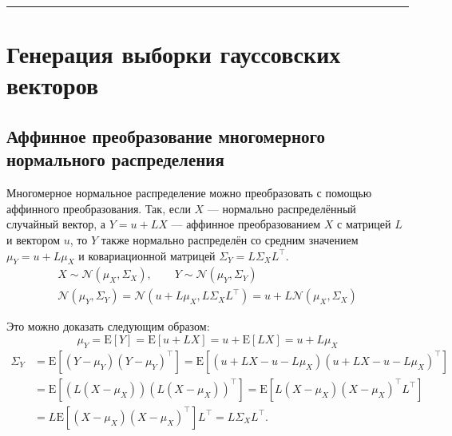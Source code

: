 \documentclass[11pt,a4paper]{article}
\begin{document}
    \begin{center}\rule{0.5\linewidth}{0.5pt}\end{center}

    \hypertarget{ux433ux435ux43dux435ux440ux430ux446ux438ux44f-ux432ux44bux431ux43eux440ux43aux438-ux433ux430ux443ux441ux441ux43eux432ux441ux43aux438ux445-ux432ux435ux43aux442ux43eux440ux43eux432}{%
\section{Генерация выборки гауссовских
векторов}\label{ux433ux435ux43dux435ux440ux430ux446ux438ux44f-ux432ux44bux431ux43eux440ux43aux438-ux433ux430ux443ux441ux441ux43eux432ux441ux43aux438ux445-ux432ux435ux43aux442ux43eux440ux43eux432}}

    \hypertarget{ux430ux444ux444ux438ux43dux43dux43eux435-ux43fux440ux435ux43eux431ux440ux430ux437ux43eux432ux430ux43dux438ux435-ux43cux43dux43eux433ux43eux43cux435ux440ux43dux43eux433ux43e-ux43dux43eux440ux43cux430ux43bux44cux43dux43eux433ux43e-ux440ux430ux441ux43fux440ux435ux434ux435ux43bux435ux43dux438ux44f}{%
\subsection{Аффинное преобразование многомерного нормального
распределения}\label{ux430ux444ux444ux438ux43dux43dux43eux435-ux43fux440ux435ux43eux431ux440ux430ux437ux43eux432ux430ux43dux438ux435-ux43cux43dux43eux433ux43eux43cux435ux440ux43dux43eux433ux43e-ux43dux43eux440ux43cux430ux43bux44cux43dux43eux433ux43e-ux440ux430ux441ux43fux440ux435ux434ux435ux43bux435ux43dux438ux44f}}

Многомерное нормальное распределение можно преобразовать с помощью
аффинного преобразования. Так, если \(X\) --- нормально распределённый
случайный вектор, а \(Y = u + LX\) --- аффинное преобразованием \(X\) с
матрицей \(L\) и вектором \(u\), то \(Y\) также нормально распределён со
средним значением \(\mu_{Y} = u + L\mu_{X}\) и ковариационной матрицей \(\Sigma_{Y} = L\Sigma_{X}L^\top\).
\begin{align*}
X \sim \mathcal{N}(\mu_{X}, \Sigma_{X}), \quad\quad Y \sim \mathcal{N}(\mu_{Y}, \Sigma_{Y}) \\
\mathcal{N}(\mu_{Y}, \Sigma_{Y}) = \mathcal{N}(u + L\mu_{X}, L\Sigma_{X}L^\top) = u + L\mathcal{N}(\mu_{X}, \Sigma_{X})
\end{align*}

Это можно доказать следующим образом:
\[\mu_{Y} = \mathrm{E}[Y] = \mathrm{E}[u + LX] = u + \mathrm{E}[LX] = u + L\mu_{X}\]
\[\begin{split}
\Sigma_{Y} & = \mathrm{E}[(Y-\mu_{Y})(Y-\mu_{Y})^\top]
           = \mathrm{E}[(u+LX - u-L\mu_{X})(u+LX - u-L\mu_{X})^\top] \\
           & = \mathrm{E}[(L(X-\mu_{X})) (L(X-\mu_{X}))^\top]
           = \mathrm{E}[L(X-\mu_{X}) (X-\mu_{X})^\top L^\top] \\
           & = L\mathrm{E}[(X-\mu_{X})(X-\mu_{X})^\top]L^\top
           = L\Sigma_{X}L^\top.
\end{split}\]
\end{document}
